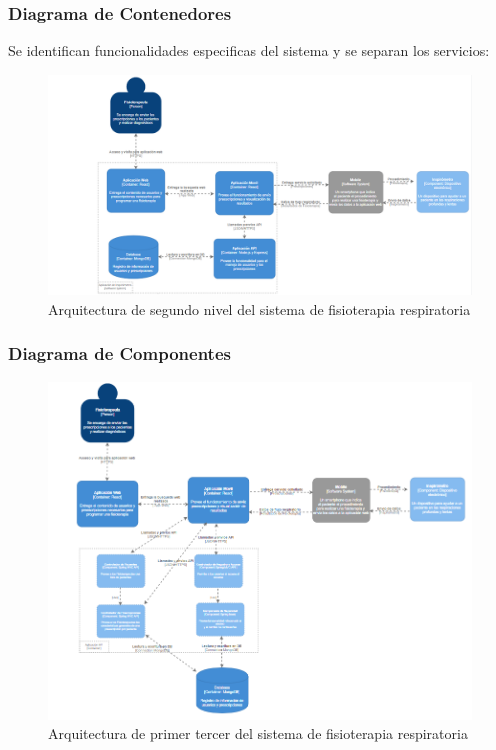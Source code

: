 \documentclass[12pt]{article}
\begin{document}
\subsubsection{Diagrama de Contenedores}
Se identifican funcionalidades especificas del sistema y se separan los servicios:

\begin{figure}[ht]
\centering
\includegraphics[scale=0.7]{imag/L2C4.PNG}
\caption{Arquitectura de segundo nivel del sistema de fisioterapia respiratoria}
\label{5}
\end{figure}
\FloatBarrier



\subsubsection{Diagrama de Componentes}


\begin{figure}[ht]
\centering
\includegraphics[scale=0.8]{imag/L3C4.PNG}
\caption{Arquitectura de primer tercer del sistema de fisioterapia respiratoria}
\label{5}
\end{figure}
\FloatBarrier
\end{document}
